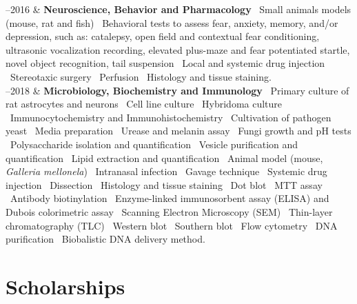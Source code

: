 \documentclass[11pt, a4paper]{article}
\newcommand{\Duration}[2]{\fontsize{10pt}{0}\selectfont #1--#2}
\begin{document}
\begin{EntriesTable}

	\Duration{2010}{2016}  &
	\textbf{Neuroscience, Behavior and Pharmacology}
	\newline
	 \textbullet \ Small animals models (mouse, rat and fish)
	 \textbullet \ Behavioral tests to assess fear, anxiety, memory, 
	 and/or depression, such as: catalepsy, open field and contextual fear 
	 conditioning, ultrasonic vocalization recording, elevated plus-maze 
	 and fear potentiated startle, novel object recognition, tail suspension
	 \textbullet \ Local and systemic drug injection
	 \textbullet \ Stereotaxic surgery
	 \textbullet \ Perfusion
	 \textbullet \ Histology and tissue staining.
	\\

	\Duration{2014}{2018}  &
	\textbf{Microbiology, Biochemistry and Immunology}
	\newline
	\textbullet \ Primary culture of rat astrocytes and neurons
	\textbullet \ Cell line culture
	\textbullet \ Hybridoma culture
	\textbullet \ Immunocytochemistry and Immunohistochemistry
	\textbullet \ Cultivation of pathogen yeast
	\textbullet \ Media preparation
	\textbullet \ Urease and melanin assay
	\textbullet \ Fungi growth and pH tests
	\textbullet \ Polysaccharide isolation and quantification
	\textbullet \ Vesicle purification and quantification
	\textbullet \ Lipid extraction and quantification
	\textbullet \ Animal model (mouse, \textit{Galleria mellonela})
	\textbullet \ Intranasal infection
	\textbullet \ Gavage technique
	\textbullet \ Systemic drug injection
	\textbullet \ Dissection
	\textbullet \ Histology and tissue staining
	\textbullet \ Dot blot
	\textbullet \ MTT assay
	\textbullet \ Antibody biotinylation
	\textbullet \ Enzyme-linked immunosorbent assay (ELISA) and Dubois
	colorimetric assay
	\textbullet \ Scanning Electron Microscopy (SEM)
	\textbullet \ Thin-layer chromatography (TLC)
	\textbullet \ Western blot
	\textbullet \ Southern blot
	\textbullet \ Flow cytometry
	\textbullet \ DNA purification
	\textbullet \ Biobalistic DNA delivery method.
	\\


\end{EntriesTable}


\section*{Scholarships}
\end{document}
